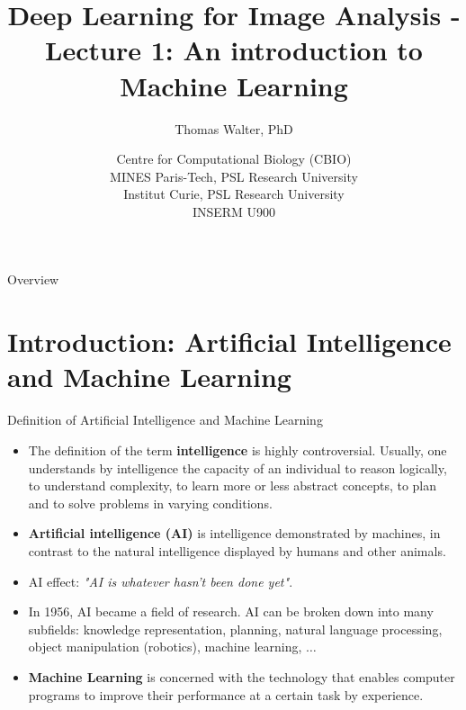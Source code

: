 \documentclass[xcolor=pdftex,dvipsnames,table]{beamer}
\title{Deep Learning for Image Analysis - \\
	   Lecture 1: An introduction to Machine Learning}
\author{Thomas Walter, PhD}
\date{Centre for Computational Biology (CBIO) \\
	  MINES Paris-Tech, PSL Research University \\
	  Institut Curie, PSL Research University \\
	  INSERM U900}
\begin{document}
\begin{frame}
\titlepage
\end{frame}

\begin{frame}{Overview}
\tableofcontents
\end{frame}

\section{Introduction: Artificial Intelligence and Machine Learning}

\begin{frame}{Definition of Artificial Intelligence and Machine Learning}
\begin{itemize}
	\item The definition of the term \textbf{intelligence} is highly controversial. Usually, one understands by intelligence the capacity of an individual to reason logically, to understand complexity, to learn more or less abstract concepts, to plan and to solve problems in varying conditions.
	\item \textbf{Artificial intelligence (AI)} is intelligence demonstrated by machines, in contrast to the natural intelligence displayed by humans and other animals.
	\item AI effect: \emph{"AI is whatever hasn't been done yet"}.
	\item In 1956, AI became a field of research. AI can be broken down into many subfields: knowledge representation, planning, natural language processing, object manipulation (robotics), machine learning, $\ldots$
	\item \textbf{Machine Learning} is concerned with the technology that enables computer programs to improve their performance at a certain task by experience.
\end{itemize}
\end{frame}
\end{document}
